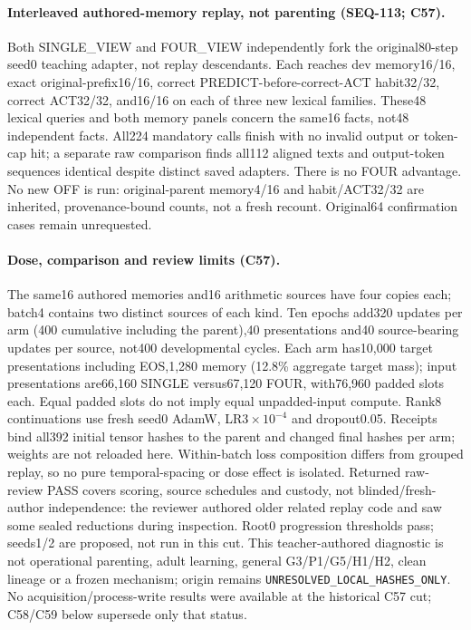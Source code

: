 \documentclass{article}
\begin{document}
\paragraph{Interleaved authored-memory replay, not parenting (SEQ-113; C57).} Both SINGLE\_VIEW and FOUR\_VIEW independently fork the original80-step seed0 teaching adapter, not replay descendants. Each reaches dev memory16/16, exact original-prefix16/16, correct PREDICT-before-correct-ACT habit32/32, correct ACT32/32, and16/16 on each of three new lexical families. These48 lexical queries and both memory panels concern the same16 facts, not48 independent facts. All224 mandatory calls finish with no invalid output or token-cap hit; a separate raw comparison finds all112 aligned texts and output-token sequences identical despite distinct saved adapters. There is no FOUR advantage. No new OFF is run: original-parent memory4/16 and habit/ACT32/32 are inherited, provenance-bound counts, not a fresh recount. Original64 confirmation cases remain unrequested.

\paragraph{Dose, comparison and review limits (C57).} The same16 authored memories and16 arithmetic sources have four copies each; batch4 contains two distinct sources of each kind. Ten epochs add320 updates per arm (400 cumulative including the parent),40 presentations and40 source-bearing updates per source, not400 developmental cycles. Each arm has10,000 target presentations including EOS,1,280 memory (12.8\% aggregate target mass); input presentations are66,160 SINGLE versus67,120 FOUR, with76,960 padded slots each. Equal padded slots do not imply equal unpadded-input compute. Rank8 continuations use fresh seed0 AdamW, LR$3\times10^{-4}$ and dropout0.05. Receipts bind all392 initial tensor hashes to the parent and changed final hashes per arm; weights are not reloaded here. Within-batch loss composition differs from grouped replay, so no pure temporal-spacing or dose effect is isolated. Returned raw-review PASS covers scoring, source schedules and custody, not blinded/fresh-author independence: the reviewer authored older related replay code and saw some sealed reductions during inspection. Root0 progression thresholds pass; seeds1/2 are proposed, not run in this cut. This teacher-authored diagnostic is not operational parenting, adult learning, general G3/P1/G5/H1/H2, clean lineage or a frozen mechanism; origin remains \texttt{UNRESOLVED\_LOCAL\_HASHES\_ONLY}. No acquisition/process-write results were available at the historical C57 cut; C58/C59 below supersede only that status.
\end{document}
